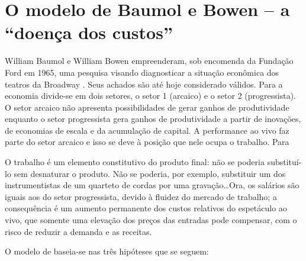\documentclass[a4paper, 12pt, openright, oneside, german, french, english, brazil]{abntex2}
\begin{document}
	\section{O modelo de Baumol e Bowen -- a ``doença dos custos''}
	
	William Baumol e William Bowen empreenderam, sob encomenda da Fundação Ford em 1965, uma pesquisa visando diagnosticar a situação econômica dos teatros da Broadway \cite{benhamou2007economia}. Seus achados são até hoje considerado válidos. Para  a economia divide-se em dois setores, o setor 1 (arcaico) e o setor 2 (progressista). O setor arcaico não apresenta possibilidades de gerar ganhos de produtividade enquanto o setor progressista gera ganhos de produtividade a partir de inovações, de economias de escala e da acumulação de capital. A performance ao vivo faz parte do setor arcaico e isso se deve à posição que nele ocupa o trabalho. Para 
	
	\begin{citacao}
		O trabalho é um elemento constitutivo do produto final: não se poderia substituí-lo sem desnaturar o produto. Não se poderia, por exemplo, substituir um dos instrumentistas de um quarteto de cordas por uma gravação\ldots Ora, os salários são iguais aos do setor progressista, devido à fluidez do mercado de trabalho; a consequência é um aumento permanente dos custos relativos do espetáculo ao vivo, que somente uma elevação dos preços das entradas pode compensar, com o risco de reduzir a demanda e as receitas. 
	\end{citacao}
	
	O modelo de  baseia-se nas três hipóteses que se seguem:
	
\end{document}
